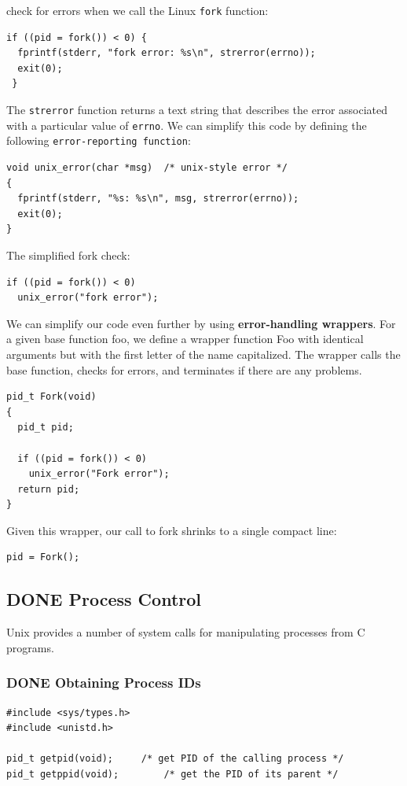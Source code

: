 \documentclass[11pt]{article}
\begin{document}
check for errors when we call the Linux \texttt{fork} function:\\
\begin{verbatim}
if ((pid = fork()) < 0) {
  fprintf(stderr, "fork error: %s\n", strerror(errno));
  exit(0);
 }
\end{verbatim}

The \texttt{strerror} function returns a text string that describes the error associated with a particular value of \texttt{errno}. We can simplify this code by defining the following \texttt{error-reporting function}:\\
\begin{verbatim}
void unix_error(char *msg)	/* unix-style error */
{
  fprintf(stderr, "%s: %s\n", msg, strerror(errno));
  exit(0);
}
\end{verbatim}

The simplified fork check:\\
\begin{verbatim}
if ((pid = fork()) < 0)
  unix_error("fork error");
\end{verbatim}


We can simplify our code even further by using \textbf{error-handling wrappers}. For a given base function foo, we define a wrapper function Foo with identical arguments but with the first letter of the name capitalized. The wrapper calls the base function, checks for errors, and terminates if there are any problems.\\
\begin{verbatim}
pid_t Fork(void)
{
  pid_t pid;

  if ((pid = fork()) < 0)
    unix_error("Fork error");
  return pid;
}
\end{verbatim}

Given this wrapper, our call to fork shrinks to a single compact line:\\
\begin{verbatim}
pid = Fork();
\end{verbatim}


\subsection{{\bfseries\sffamily DONE} Process Control}
\label{sec:orga2602e6}
Unix provides a number of system calls for manipulating processes from C programs.\\

\subsubsection{{\bfseries\sffamily DONE} Obtaining Process IDs}
\label{sec:orga05dd56}
\begin{verbatim}
#include <sys/types.h>
#include <unistd.h>

pid_t getpid(void);		/* get PID of the calling process */
pid_t getppid(void);		/* get the PID of its parent */
\end{verbatim}
\end{document}
